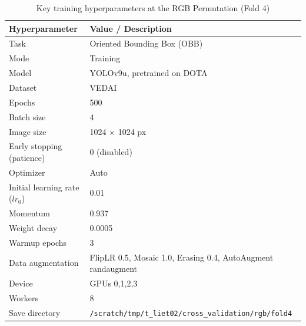 \begin{table}[htbp]
\centering
\caption{Key training hyperparameters at the \acrshort{RGB} Permutation (Fold 4)}
\label{tab:hyperparameters}
\begin{tabular}{ll}
\hline
\textbf{Hyperparameter} & \textbf{Value / Description} \\
\hline
Task & Oriented Bounding Box (OBB) \\
Mode & Training \\
Model & YOLOv9u, pretrained on \acrshort{DOTA} \\
Dataset & \acrshort{VEDAI}  \\
Epochs & 500 \\
Batch size & 4 \\
Image size & 1024 × 1024 px \\
Early stopping (patience) & 0 (disabled) \\
Optimizer & Auto \\
Initial learning rate ($lr_0$) & 0.01 \\
Momentum & 0.937 \\
Weight decay & 0.0005 \\
Warmup epochs & 3 \\
Data augmentation & FlipLR 0.5, Mosaic 1.0, Erasing 0.4, AutoAugment randaugment \\
Device & GPUs 0,1,2,3 \\
Workers & 8 \\
Save directory & \texttt{/scratch/tmp/t\_liet02/cross\_validation/rgb/fold4} \\
\hline
\end{tabular}
\end{table}



